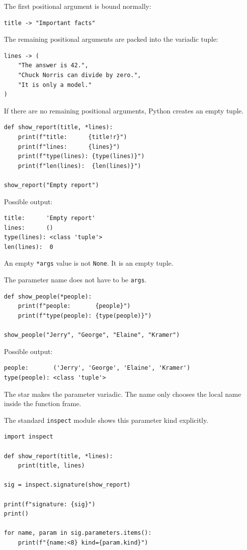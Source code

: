 The first positional argument is bound normally:

\begin{verbatim}
title -> "Important facts"
\end{verbatim}

The remaining positional arguments are packed into the variadic tuple:

\begin{verbatim}
lines -> (
    "The answer is 42.",
    "Chuck Norris can divide by zero.",
    "It is only a model."
)
\end{verbatim}

If there are no remaining positional arguments, Python creates an empty tuple.

\begin{verbatim}
def show_report(title, *lines):
    print(f"title:      {title!r}")
    print(f"lines:      {lines}")
    print(f"type(lines): {type(lines)}")
    print(f"len(lines):  {len(lines)}")

show_report("Empty report")
\end{verbatim}

Possible output:

\begin{verbatim}
title:      'Empty report'
lines:      ()
type(lines): <class 'tuple'>
len(lines):  0
\end{verbatim}

An empty \texttt{*args} value is not \texttt{None}. It is an empty tuple.

The parameter name does not have to be \texttt{args}.

\begin{verbatim}
def show_people(*people):
    print(f"people:       {people}")
    print(f"type(people): {type(people)}")

show_people("Jerry", "George", "Elaine", "Kramer")
\end{verbatim}

Possible output:

\begin{verbatim}
people:       ('Jerry', 'George', 'Elaine', 'Kramer')
type(people): <class 'tuple'>
\end{verbatim}

The star makes the parameter variadic. The name only chooses the local name inside the function frame.

The standard \texttt{inspect} module shows this parameter kind explicitly.

\begin{verbatim}
import inspect

def show_report(title, *lines):
    print(title, lines)

sig = inspect.signature(show_report)

print(f"signature: {sig}")
print()

for name, param in sig.parameters.items():
    print(f"{name:<8} kind={param.kind}")
\end{verbatim}

